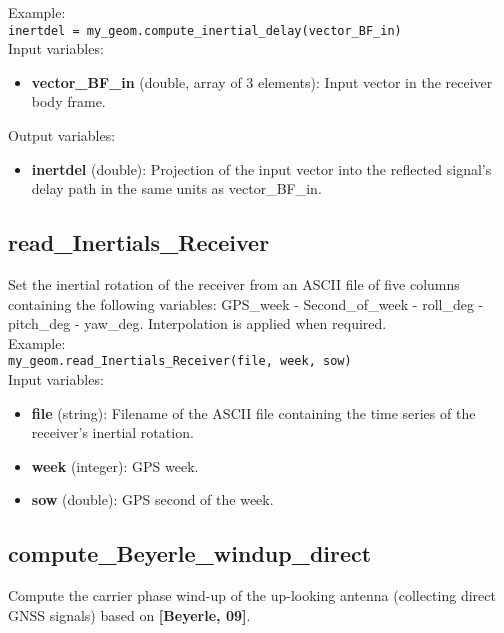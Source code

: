 Example:\\

\texttt{inertdel = my\_geom.compute\_inertial\_delay(vector\_BF\_in)}\\

Input variables:
\begin{itemize}
\item {\bf vector\_BF\_in} (double, array of 3 elements): Input vector in the receiver body frame.
\end{itemize}

Output variables:
\begin{itemize}
\item {\bf inertdel} (double): Projection of the input vector into the reflected signal's delay path in the same units as vector\_BF\_in.
\end{itemize}


\subsection{read\_Inertials\_Receiver}

Set the inertial rotation of the receiver from an ASCII file of five columns containing the following variables: GPS\_week - Second\_of\_week - roll\_deg - pitch\_deg - yaw\_deg. Interpolation is applied when required.\\

Example:\\

\texttt{my\_geom.read\_Inertials\_Receiver(file, week, sow)}\\

Input variables:
\begin{itemize}
\item {\bf file} (string): Filename of the ASCII file containing the time series of the receiver's inertial rotation.
\item {\bf week} (integer): GPS week.
\item {\bf sow} (double): GPS second of the week.
\end{itemize}


\subsection{compute\_Beyerle\_windup\_direct}

Compute the carrier phase wind-up of the up-looking antenna (collecting direct GNSS signals) based on {\bf [Beyerle, 09]}.\\

